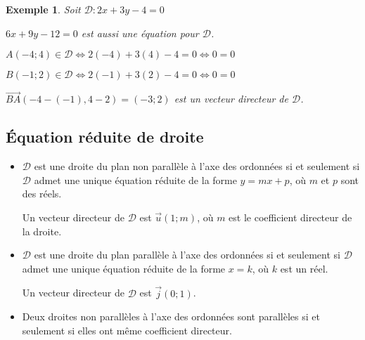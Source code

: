 \documentclass[a4paper,11pt]{article}
\theoremstyle{break}
\newcounter{enonce}
\newtheorem{exemple}[enonce]{Exemple}
\begin{document}
    \begin{exemple}
    Soit $\mathcal{D}:2 x+3 y-4=0$
    \begin{center}

   
   $6x+9y-12=0$ est aussi une équation pour $\mathcal{D}$.
   
   $A(-4;4) \in \mathcal{D} \iff {2(-4)+3(4)-4=0} \iff {0=0}$
   
   
   $B(-1;2) \in \mathcal{D} \iff {2(-1)+3(2)-4=0} \iff {0=0}$
   
  
   $\vec{BA}(-4-(-1),4-2)=(-3;2)$ est un {vecteur directeur} de $\mathcal{D}$.
   \end{center}
   \end{exemple}
   
   \subsection{\'Equation réduite de droite}
   
     \begin{theorem}
     
     \begin{itemize}
      \item 
      $\mathcal{D}$ est une droite du plan non parallèle à l'axe des ordonnées si et seulement si
    $\mathcal{D}$ admet une {unique} équation réduite de la forme $y=mx+p$, où $m$ et $p$ sont des réels.
    
    Un vecteur directeur de $\mathcal{D}$ est $\vec{u}{(1;m)}$, où $m$ est le coefficient directeur
    de la droite.
    
    \item
    $\mathcal{D}$ est une droite du plan parallèle à l'axe des ordonnées si et seulement si
    $\mathcal{D}$ admet une unique équation réduite de la forme {$x=k$}, où $k$ est un réel.
    
    Un vecteur directeur de $\mathcal{D}$ est $\vec{j}(0;1)$.
    
    \item Deux droites non parallèles à l'axe des ordonnées sont parallèles si et seulement si 
    elles ont même {coefficient directeur}.
     \end{itemize}
     
   \end{theorem}
\end{document}
